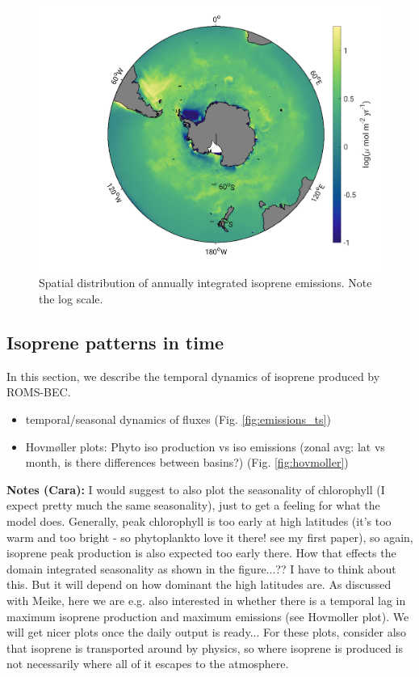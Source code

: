 \documentclass[draft,linenumbers]{agujournal}
\begin{document}
\begin{figure}[h]
\centering
\includegraphics[width=.6\textwidth]{Plots/Isoprene_emissions_annual_031.png}
\caption{Spatial distribution of annually integrated isoprene emissions. Note the log scale.}
\label{fig:emissions_map}
\end{figure}



\subsection{Isoprene patterns in time}
In this section, we describe the temporal dynamics of isoprene produced by ROMS-BEC.
\begin{itemize}
\item temporal/seasonal dynamics of fluxes (Fig. \ref{fig:emissions_ts})
\item Hovm{\o}ller plots: Phyto iso production vs iso emissions (zonal avg: lat vs month, is there differences between basins?) (Fig. \ref{fig:hovmoller})
\end{itemize}

\textbf{Notes (Cara):}
I would suggest to also plot the seasonality of chlorophyll (I expect pretty much the same seasonality), just to get a feeling for what the model does. Generally, peak chlorophyll is too early at high latitudes (it's too warm and too bright - so phytoplankto love it there! see my first paper), so again, isoprene peak production is also expected too early there. How that effects the domain integrated seasonality as shown in the figure...?? I have to think about this. But it will depend on how dominant the high latitudes are.
As discussed with Meike, here we are e.g. also interested in whether there is a temporal lag in maximum isoprene production and maximum emissions (see Hovmoller plot). We will get nicer plots once the daily output is ready... For these plots, consider also that isoprene is transported around by physics, so where isoprene is produced is not necessarily where all of it escapes to the atmosphere.
\end{document}
